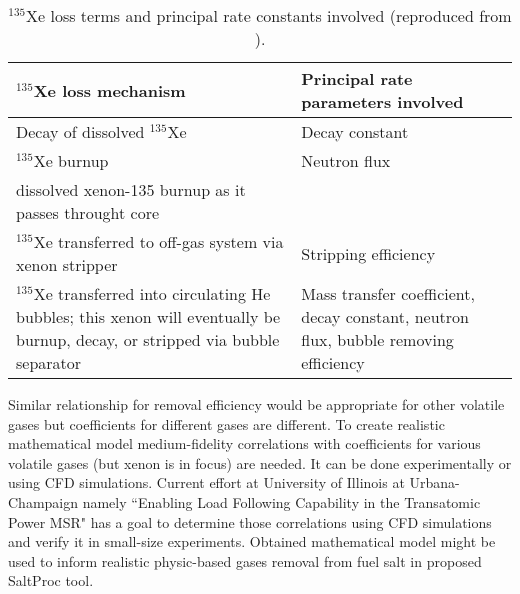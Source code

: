 \begin{table}[ht!]
\caption{$^{135}$Xe loss terms and principal rate constants involved
 (reproduced from \cite{kedl_development_1967}).}
  \centering
\begin{tabularx}{\textwidth}{b | b}
\hline \textbf{$^{135}$Xe loss mechanism}      & \textbf{Principal rate 
parameters involved}  	\\
\hline Decay of dissolved $^{135}$Xe  & Decay constant							\\
\hline $^{135}$Xe burnup              &  Neutron flux		 					\\
dissolved xenon-135 burnup as it passes throught core  & 			            \\		\hline $^{135}$Xe transferred to off-gas system via xenon stripper & Stripping efficiency		\\
\hline $^{135}$Xe transferred into circulating He bubbles; this xenon will eventually be burnup, decay, or stripped via bubble separator & Mass transfer coefficient, decay constant, neutron flux, bubble removing efficiency		\\
\hline 
\end{tabularx}
  		\label{tab:xe_loss}
\end{table}

Similar relationship for removal efficiency would be appropriate 
for other volatile gases but coefficients for different gases are 
different. To create realistic mathematical model medium-fidelity correlations with 
coefficients for various volatile gases (but xenon is in focus) are needed. It can be 
done experimentally or using CFD simulations. Current effort at University of 
 Illinois at Urbana-Champaign namely ``Enabling Load Following Capability in the 
Transatomic Power MSR" has a goal to determine those correlations using CFD simulations 
and verify it in small-size experiments. Obtained mathematical model might be used 
to inform realistic physic-based gases removal from fuel salt in proposed SaltProc
 tool.

